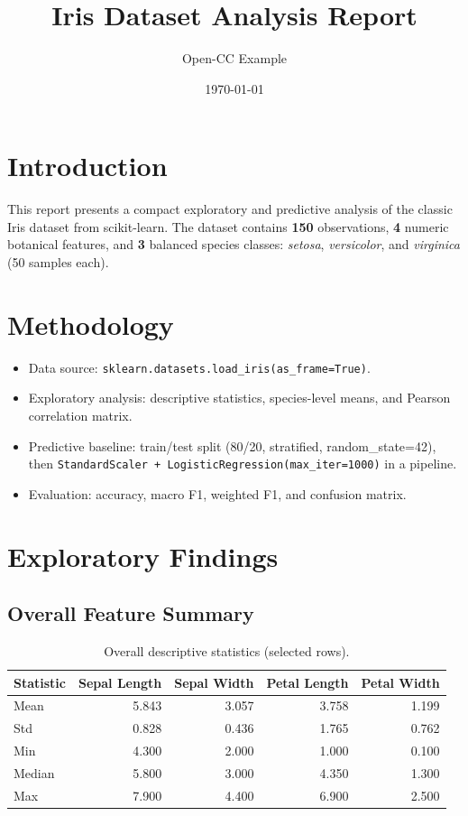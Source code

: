 \documentclass[11pt]{article}
\title{Iris Dataset Analysis Report}
\author{Open-CC Example}
\date{\today}
\begin{document}
\maketitle

\section{Introduction}
This report presents a compact exploratory and predictive analysis of the classic Iris dataset from scikit-learn.
The dataset contains \textbf{150} observations, \textbf{4} numeric botanical features, and \textbf{3} balanced species classes:
\emph{setosa}, \emph{versicolor}, and \emph{virginica} (50 samples each).

\section{Methodology}
\begin{itemize}
    \item Data source: \texttt{sklearn.datasets.load\_iris(as\_frame=True)}.
    \item Exploratory analysis: descriptive statistics, species-level means, and Pearson correlation matrix.
    \item Predictive baseline: train/test split (80/20, stratified, random\_state=42), then
    \texttt{StandardScaler + LogisticRegression(max\_iter=1000)} in a pipeline.
    \item Evaluation: accuracy, macro F1, weighted F1, and confusion matrix.
\end{itemize}

\section{Exploratory Findings}
\subsection{Overall Feature Summary}
\begin{table}[H]
\centering
\begin{tabular}{lrrrr}
\toprule
Statistic & Sepal Length & Sepal Width & Petal Length & Petal Width \\
\midrule
Mean & 5.843 & 3.057 & 3.758 & 1.199 \\
Std & 0.828 & 0.436 & 1.765 & 0.762 \\
Min & 4.300 & 2.000 & 1.000 & 0.100 \\
Median & 5.800 & 3.000 & 4.350 & 1.300 \\
Max & 7.900 & 4.400 & 6.900 & 2.500 \\
\bottomrule
\end{tabular}
\caption{Overall descriptive statistics (selected rows).}
\end{table}
\end{document}
